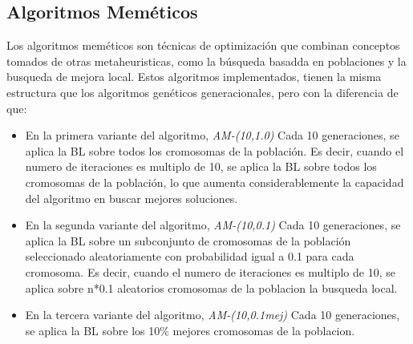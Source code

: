 \documentclass{article}
\begin{document}
\subsection{\normalsize Algoritmos Meméticos}
Los algoritmos meméticos son técnicas de optimización que combinan conceptos 
tomados de otras metaheuristicas, como la búsqueda basadda en poblaciones y la busqueda 
de mejora local.
Estos algoritmos implementados, tienen la misma estructura que los algoritmos genéticos
generacionales, pero con la diferencia de que:
\begin{itemize}
\item En la primera variante del algoritmo, \emph{AM-(10,1.0)} Cada 10 generaciones, se aplica la BL sobre todos los
cromosomas de la población.
Es decir, cuando el numero de iteraciones es multiplo de 10, se aplica la BL sobre todos los
cromosomas de la población, lo que aumenta considerablemente la capacidad del 
algoritmo en buscar mejores soluciones.
\item En la segunda variante del algoritmo, \emph{AM-(10,0.1)} Cada 10 generaciones, se aplica la BL sobre un 
subconjunto de cromosomas de la población seleccionado aleatoriamente con probabilidad igual a 0.1 para cada cromosoma.
Es decir, cuando el numero de iteraciones es multiplo de 10, se aplica sobre n*0.1 aleatorios cromosomas de la 
poblacion la busqueda local.
\item En la tercera variante del algoritmo, \emph{AM-(10,0.1mej)} Cada 10 generaciones, se aplica la BL sobre los 10\%
mejores cromosomas de la poblacion. 
\end{itemize}
\end{document}
